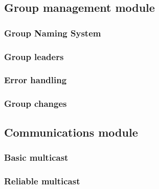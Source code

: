 \documentclass[titlepage, twocolumn, a4paper, 10pt]{article}
\begin{document}
\subsection{Group management module}\label{sec:group-management-module}

\subsubsection{Group Naming System}\label{sec:group-naming-system}

\subsubsection{Group leaders}\label{sec:group-leaders}

\subsubsection{Error handling}\label{sec:error-handling}

\subsubsection{Group changes}\label{sec:group-changes}

    
\subsection{Communications module}\label{sec:communications-module}
\subsubsection{Basic multicast}\label{sec:basic-multicast}
\subsubsection{Reliable multicast}\label{sec:reliable-multicast}
\end{document}
